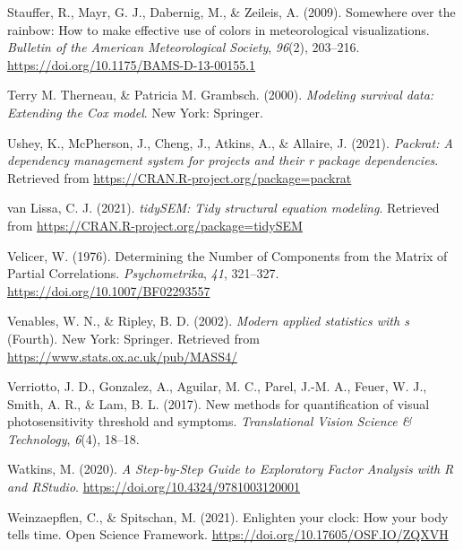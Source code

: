 \documentclass[
  english,
  man]{apa6}
\newlength{\cslhangindent}
\newlength{\cslentryspacingunit} %
\newenvironment{CSLReferences}[2] %
 {%
  \setlength{\parindent}{0pt}
  \ifodd #1
  \let\oldpar\par
  \def\par{\hangindent=\cslhangindent\oldpar}
  \fi
  \setlength{\parskip}{#2\cslentryspacingunit}
 }%
 {}
\begin{document}
\begin{CSLReferences}{1}{0}
\leavevmode{}%
Stauffer, R., Mayr, G. J., Dabernig, M., \& Zeileis, A. (2009). Somewhere over the rainbow: How to make effective use of colors in meteorological visualizations. \emph{Bulletin of the American Meteorological Society}, \emph{96}(2), 203--216. \url{https://doi.org/10.1175/BAMS-D-13-00155.1}

\leavevmode{}%
Terry M. Therneau, \& Patricia M. Grambsch. (2000). \emph{Modeling survival data: Extending the {C}ox model}. New York: Springer.

\leavevmode{}%
Ushey, K., McPherson, J., Cheng, J., Atkins, A., \& Allaire, J. (2021). \emph{Packrat: A dependency management system for projects and their r package dependencies}. Retrieved from \url{https://CRAN.R-project.org/package=packrat}

\leavevmode{}%
van Lissa, C. J. (2021). \emph{tidySEM: Tidy structural equation modeling}. Retrieved from \url{https://CRAN.R-project.org/package=tidySEM}

\leavevmode{}%
Velicer, W. (1976). Determining the {Number} of {Components} from the {Matrix} of {Partial Correlations}. \emph{Psychometrika}, \emph{41}, 321--327. \url{https://doi.org/10.1007/BF02293557}

\leavevmode{}%
Venables, W. N., \& Ripley, B. D. (2002). \emph{Modern applied statistics with s} (Fourth). New York: Springer. Retrieved from \url{https://www.stats.ox.ac.uk/pub/MASS4/}

\leavevmode{}%
Verriotto, J. D., Gonzalez, A., Aguilar, M. C., Parel, J.-M. A., Feuer, W. J., Smith, A. R., \& Lam, B. L. (2017). New methods for quantification of visual photosensitivity threshold and symptoms. \emph{Translational Vision Science \& Technology}, \emph{6}(4), 18--18.

\leavevmode{}%
Watkins, M. (2020). \emph{A {Step}-by-{Step Guide} to {Exploratory Factor Analysis} with {R} and {RStudio}}. \url{https://doi.org/10.4324/9781003120001}

\leavevmode{}%
Weinzaepflen, C., \& Spitschan, M. (2021). Enlighten your clock: How your body tells time. {Open Science Framework}. \url{https://doi.org/10.17605/OSF.IO/ZQXVH}


\end{CSLReferences}
\end{document}
